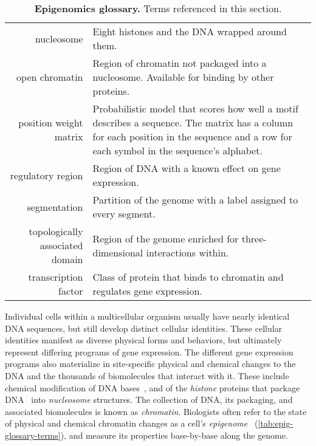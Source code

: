 \documentclass[5p]{elsarticle}
\begin{document}
\begin{table*}[t]
\begin{tabular*}{\linewidth}{r@{\extracolsep{\fill}}p{}}
    nucleosome & Eight histones and the DNA wrapped around them. \\
    open chromatin & Region of chromatin not packaged into a nucleosome. Available for binding by other proteins. \\
    position weight matrix & Probabilistic model that scores how well a motif describes a sequence.
    The matrix has a column for each position in the sequence and a row for each symbol in the sequence's alphabet. \\
    regulatory region & Region of DNA with a known effect on gene expression. \\
    segmentation & Partition of the genome with a label assigned to every segment. \\
    topologically associated domain & Region of the genome enriched for three-dimensional interactions within. \\
    transcription factor & Class of protein that binds to chromatin and regulates gene expression. \\
    \bottomrule
  \end{tabular*}
  \caption{\textbf{Epigenomics glossary.}
    Terms referenced in this section.}
  \label{tab:epig-glossary-terms}
\end{table*}

Individual cells within a multicellular organism usually have nearly identical DNA sequences, but still develop distinct cellular identities.
These cellular identities manifest as diverse physical forms and behaviors, but ultimately represent differing programs of gene expression.
The different gene expression programs also materialize in site-specific physical and chemical changes to the DNA and the thousands of biomolecules that interact with it.
These include chemical modification of DNA bases~\cite{Klose2006GenomicMediators,Severin2013EffectsSeparation,Spruijt2014DNATricks}, and of the \emph{histone} proteins that package DNA~\cite{Rothbart2014InterpretingModifications,Stirzaker2014MiningChallenges} into \emph{nucleosome} structures. %
The collection of DNA, its packaging, and associated biomolecules is known as \emph{chromatin}.
Biologists often refer to the state of physical and chemical chromatin changes as a cell's \emph{epi\-geno\-me}~\cite{Lappalainen2017AssociatingPhenotypes} (\autoref{tab:epig-glossary-terms}), and measure its properties base-by-base along the genome.
\end{document}
